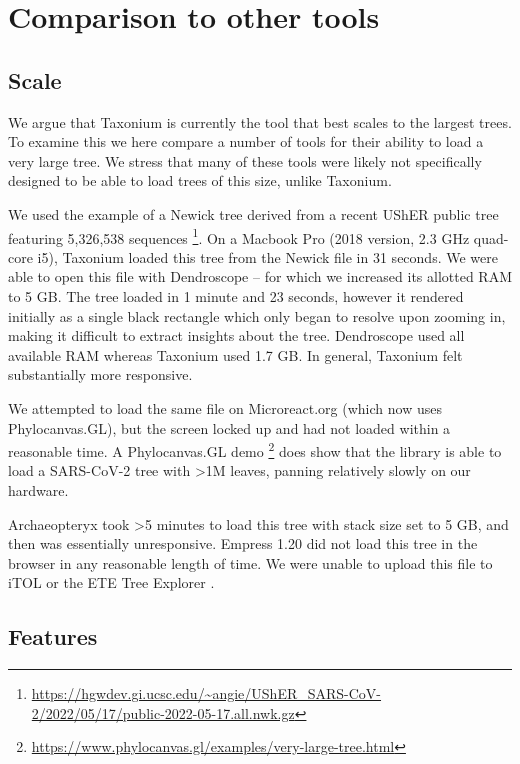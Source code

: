 \section*{Comparison to other tools}

\subsection*{Scale}

We argue that Taxonium is currently the tool that best scales to the largest trees. To examine this we here compare a number of tools for their ability to load a very large tree. We stress that many of these tools were likely not specifically designed to be able to load trees of this size, unlike Taxonium.

We used the example of a Newick tree derived from a recent UShER public tree \citep{McBroome2021} featuring 5,326,538 sequences \footnote{\url{https://hgwdev.gi.ucsc.edu/~angie/UShER_SARS-CoV-2/2022/05/17/public-2022-05-17.all.nwk.gz}}. On a Macbook Pro (2018 version, 2.3 GHz quad-core i5), Taxonium loaded this tree from the Newick file in 31 seconds. We were able to open this file with Dendroscope -- for which we increased its allotted RAM to 5 GB. The tree loaded in 1 minute and 23 seconds, however it rendered initially as a single black rectangle which only began to resolve upon zooming in, making it difficult to extract insights about the tree. Dendroscope used all available RAM whereas Taxonium used 1.7 GB. In general, Taxonium felt substantially more responsive.

We attempted to load the same file on Microreact.org \citep{argimon2016microreact} (which now uses Phylocanvas.GL), but the screen locked up and had not loaded within a reasonable time. A Phylocanvas.GL demo \footnote{\url{https://www.phylocanvas.gl/examples/very-large-tree.html}} does show that the library \citep{abudahab2021phylocanvas} is able to load a SARS-CoV-2 tree with >1M leaves, panning relatively slowly on our hardware.

Archaeopteryx \citep{archaeopteryx} took >5 minutes to load this tree with stack size set to 5 GB, and then was essentially unresponsive. Empress 1.20 \citep{CantrellFedarko2021empress} did not load this tree in the browser in any reasonable length of time. We were unable to upload this file to iTOL \citep{itol} or the ETE Tree Explorer \citep{ete}.

\subsection*{Features}

